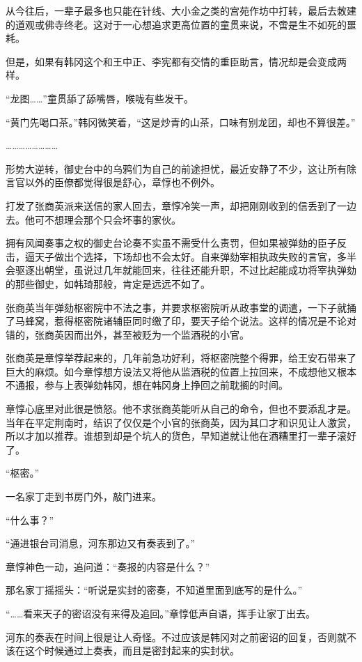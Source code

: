 从今往后，一辈子最多也只能在针线、大小金之类的宫苑作坊中打转，最后去敇建的道观或佛寺终老。这对于一心想追求更高位置的童贯来说，不啻是生不如死的噩耗。

但是，如果有韩冈这个和王中正、李宪都有交情的重臣助言，情况却是会变成两样。

“龙图……”童贯舔了舔嘴唇，喉咙有些发干。

“黄门先喝口茶。”韩冈微笑着，“这是炒青的山茶，口味有别龙团，却也不算很差。”

……………………

形势大逆转，御史台中的乌鸦们为自己的前途担忧，最近安静了不少，这让所有除言官以外的臣僚都觉得很是舒心，章惇也不例外。

打发了张商英派来送信的家人回去，章惇冷笑一声，却把刚刚收到的信丢到了一边去。他可不想理会那个只会坏事的家伙。

拥有风闻奏事之权的御史台论奏不实虽不需受什么责罚，但如果被弹劾的臣子反击，逼天子做出个选择，下场却也不会太好。自来弹劾宰相执政失败的言官，多半会驱逐出朝堂，虽说过几年就能回来，往往还能升职，不过比起能成功将宰执弹劾的那些御史，如韩琦那般，肯定是远远不如了。

张商英当年弹劾枢密院中不法之事，并要求枢密院听从政事堂的调遣，一下子就捅了马蜂窝，惹得枢密院诸辅臣同时缴了印，要天子给个说法。这样的情况是不论对错的，张商英因而出外，甚至被贬为一个监酒税的小官。

张商英是章惇举荐起来的，几年前急功好利，将枢密院整个得罪，给王安石带来了巨大的麻烦。如今章惇想方设法又将他从监酒税的位置上拉回来，不成想他又根本不通报，参与上表弹劾韩冈，想在韩冈身上挣回之前耽搁的时间。

章惇心底里对此很是愤怒。他不求张商英能听从自己的命令，但也不要添乱才是。当年在平定荆南时，结识了仅仅是个小官的张商英，因为其口才和识见让人激赏，所以才加以推荐。谁想到却是个坑人的货色，早知道就让他在酒糟里打一辈子滚好了。

“枢密。”

一名家丁走到书房门外，敲门进来。

“什么事？”

“通进银台司消息，河东那边又有奏表到了。”

章惇神色一动，追问道：“奏报的内容是什么？”

那名家丁摇摇头：“听说是实封的密奏，不知道里面到底写的是什么。”

“……看来天子的密诏没有来得及追回。”章惇低声自语，挥手让家丁出去。

河东的奏表在时间上很是让人奇怪。不过应该是韩冈对之前密诏的回复，否则就不该在这个时候通过上奏表，而且是密封起来的实封状。

